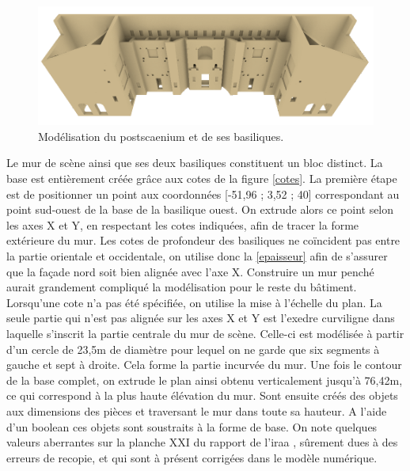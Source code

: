 \begin{figure}[!h]
	\includegraphics[width=\linewidth]{images/modMur2}
	\caption{Modélisation du \gls{postscaenium} et de ses \glspl{basilique}.} 
	\label{modCavea} 
\end{figure} 

Le mur de scène ainsi que ses deux basiliques constituent un bloc distinct. La base est entièrement créée grâce aux cotes de la figure \ref{cotes}. La première étape est de positionner un point aux coordonnées [-51,96 ; 3,52 ; 40] correspondant au point sud-ouest de la base de la basilique ouest. On extrude alors ce point selon les axes X et Y, en respectant les cotes indiquées, afin de tracer la forme extérieure du mur. Les cotes de profondeur des basiliques ne coïncident pas entre la partie orientale et occidentale, on utilise donc la \ref{epaisseur} afin de s'assurer que la façade nord soit bien alignée avec l'axe X. Construire un mur penché aurait grandement compliqué la modélisation pour le reste du bâtiment. Lorsqu'une cote n'a pas été spécifiée, on utilise la mise à l'échelle du plan. La seule partie qui n'est pas alignée sur les axes X et Y est l'\gls{exedre} curviligne dans laquelle s'inscrit la partie centrale du mur de scène. Celle-ci est modélisée à partir d'un cercle de 23,5m de diamètre pour lequel on ne garde que six segments à gauche et sept à droite. Cela forme la partie incurvée du mur. Une fois le contour de la base complet, on extrude le plan ainsi obtenu verticalement jusqu'à 76,42m, ce qui correspond à la plus haute élévation du mur. Sont ensuite créés des objets aux dimensions des pièces et traversant le mur dans toute sa hauteur. A l'aide d'un \gls{boolean} ces objets sont soustraits à la forme de base. On note quelques valeurs aberrantes sur la planche XXI du rapport de l'\gls{iraa} \cite[Pl. XXI]{orangePl}, sûrement dues à des erreurs de recopie, et qui sont à présent corrigées dans le modèle numérique. 

